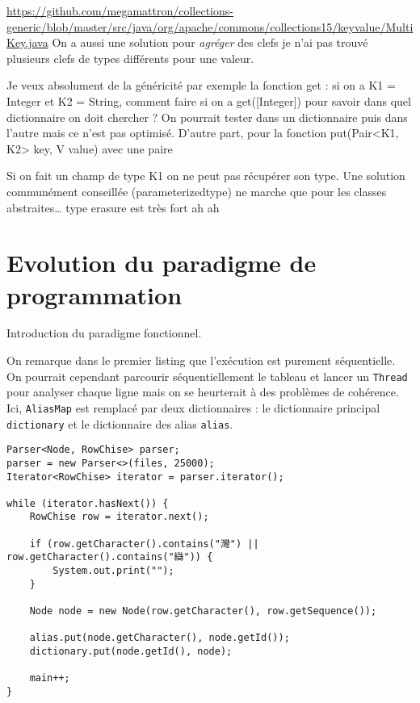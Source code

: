 \url{https://github.com/megamattron/collections-generic/blob/master/src/java/org/apache/commons/collections15/keyvalue/MultiKey.java} On a aussi une solution pour \textsl{agréger} des clefs je n'ai pas trouvé plusieurs clefs de types différents pour une valeur.

Je veux absolument de la généricité par exemple la fonction get : si on a K1 = Integer et K2 = String, comment faire si on a get([Integer]) pour savoir dans quel dictionnaire on doit chercher ? On pourrait tester dans un dictionnaire puis dans l'autre mais ce n'est pas optimisé. D'autre part, pour la fonction put(Pair<K1, K2> key, V value) avec une paire





Si on fait un champ de type K1 on ne peut pas récupérer son type. Une solution communément conseillée (parameterizedtype) ne marche que pour les classes abstraites\dots{} type erasure est très fort ah ah

\section{Evolution du paradigme de programmation}
Introduction du paradigme fonctionnel.

On remarque dans le premier listing que l'exécution est purement séquentielle. On pourrait cependant parcourir séquentiellement le tableau et lancer un \texttt{Thread} pour analyser chaque ligne mais on se heurterait à des problèmes de cohérence. Ici, \texttt{AliasMap} est remplacé par deux dictionnaires : le dictionnaire principal \texttt{dictionary} et le dictionnaire des alias \texttt{alias}.
\begin{lstlisting}[caption={Impératif pur. Premier jet sans \texttt{AliasMap}}]
Parser<Node, RowChise> parser;
parser = new Parser<>(files, 25000);
Iterator<RowChise> iterator = parser.iterator();

while (iterator.hasNext()) {
	RowChise row = iterator.next();

	if (row.getCharacter().contains("灣") || row.getCharacter().contains("䜌")) {
		System.out.print("");
	}

	Node node = new Node(row.getCharacter(), row.getSequence());

	alias.put(node.getCharacter(), node.getId());
	dictionary.put(node.getId(), node);

	main++;
}
\end{lstlisting}

